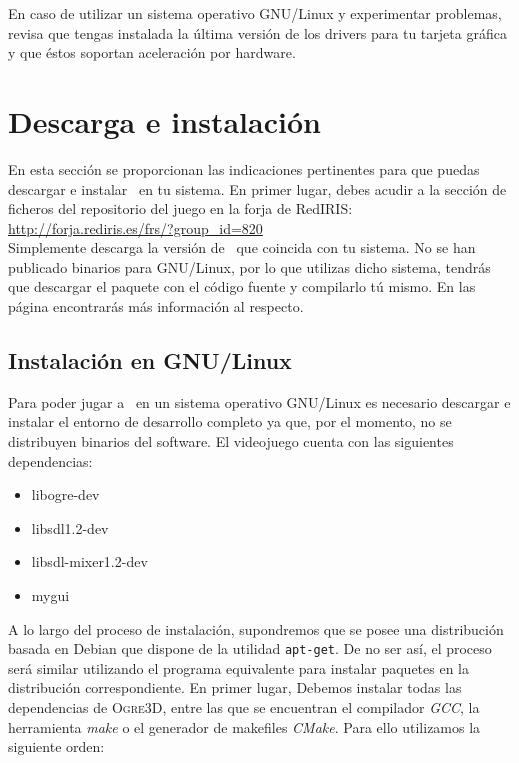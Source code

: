 \documentclass[a4paper,11pt]{article}
\begin{document}
En caso de utilizar un sistema operativo GNU/Linux y experimentar problemas,
revisa que tengas instalada la última versión de los drivers para tu
tarjeta gráfica y que éstos soportan aceleración por hardware.

\section{Descarga e instalación}
En esta sección se proporcionan las indicaciones pertinentes para que puedas
descargar e instalar \juego\ en tu sistema. En primer lugar, debes acudir
a la sección de ficheros del repositorio del juego en la forja de RedIRIS:\\

\url{http://forja.rediris.es/frs/?group_id=820}\\

Simplemente descarga la versión de \juego\ que coincida con tu sistema. 
No se han publicado binarios para GNU/Linux, por lo que utilizas dicho sistema,
tendrás que descargar el paquete con el código fuente y compilarlo tú mismo.
En las página \pageref{sec:instalacion-linux} encontrarás más información
al respecto.

\subsection{Instalación en GNU/Linux}
\label{sec:instalacion-linux}

Para poder jugar a \juego\ en un sistema operativo GNU/Linux es necesario
descargar e instalar el entorno de desarrollo completo ya que, por el
momento, no se distribuyen binarios del software. El videojuego cuenta
con las siguientes dependencias:

\begin{itemize}
    \itemsep0em
    \item libogre-dev
    \item libsdl1.2-dev
    \item libsdl-mixer1.2-dev
    \item mygui
\end{itemize}

A lo largo del proceso de instalación, supondremos que se posee una distribución
basada en Debian que dispone de la utilidad \texttt{apt-get}. De no ser así,
el proceso será similar utilizando el programa equivalente para instalar
paquetes en la distribución correspondiente. En primer lugar, Debemos
instalar todas las dependencias de \textsc{Ogre3D}, entre las que
se encuentran el compilador \textit{GCC}, la herramienta \textit{make}
o el generador de makefiles \textit{CMake}. Para ello utilizamos
la siguiente orden:
\end{document}
